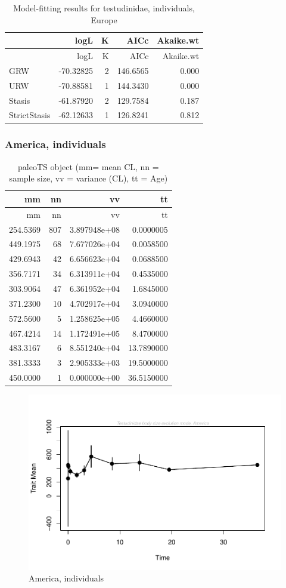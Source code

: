 \documentclass[]{article}
\begin{document}
\begin{longtable}[]{@{}lrrrr@{}}
\caption{Model-fitting results for testudinidae, individuals,
Europe}\tabularnewline
\toprule
& logL & K & AICc & Akaike.wt\tabularnewline
\midrule
\endfirsthead
\toprule
& logL & K & AICc & Akaike.wt\tabularnewline
\midrule
\endhead
GRW & -70.32825 & 2 & 146.6565 & 0.000\tabularnewline
URW & -70.88581 & 1 & 144.3430 & 0.000\tabularnewline
Stasis & -61.87920 & 2 & 129.7584 & 0.187\tabularnewline
StrictStasis & -62.12633 & 1 & 126.8241 & 0.812\tabularnewline
\bottomrule
\end{longtable}

\newpage

\subsubsection{America, individuals}\label{america-individuals}

\begin{longtable}[]{@{}rrrr@{}}
\caption{paleoTS object (mm= mean CL, nn = sample size, vv = variance
(CL), tt = Age)}\tabularnewline
\toprule
mm & nn & vv & tt\tabularnewline
\midrule
\endfirsthead
\toprule
mm & nn & vv & tt\tabularnewline
\midrule
\endhead
254.5369 & 807 & 3.897948e+08 & 0.0000005\tabularnewline
449.1975 & 68 & 7.677026e+04 & 0.0058500\tabularnewline
429.6943 & 42 & 6.656623e+04 & 0.0688500\tabularnewline
356.7171 & 34 & 6.313911e+04 & 0.4535000\tabularnewline
303.9064 & 47 & 6.361952e+04 & 1.6845000\tabularnewline
371.2300 & 10 & 4.702917e+04 & 3.0940000\tabularnewline
572.5600 & 5 & 1.258625e+05 & 4.4660000\tabularnewline
467.4214 & 14 & 1.172491e+05 & 8.4700000\tabularnewline
483.3167 & 6 & 8.551240e+04 & 13.7890000\tabularnewline
381.3333 & 3 & 2.905333e+03 & 19.5000000\tabularnewline
450.0000 & 1 & 0.000000e+00 & 36.5150000\tabularnewline
\bottomrule
\end{longtable}

\begin{figure}[htbp]
\centering
\includegraphics{MA_JJ_files/figure-latex/paleoTS, individuals, America-1.pdf}
\caption{America, individuals}
\end{figure}
\end{document}
